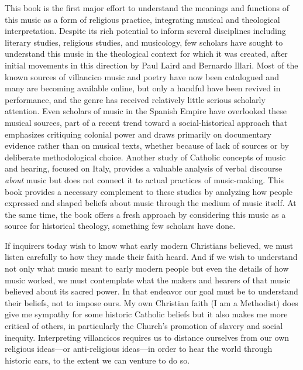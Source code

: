 This book is the first major effort to understand the meanings and functions of
this music as a form of religious practice, integrating musical and theological
interpretation.
Despite its rich potential to inform several disciplines including literary
studies, religious studies, and musicology, few scholars have sought to
understand this music in the theological context for which it was created,
after initial movements in this direction by Paul Laird and Bernardo Illari.%
    \Autocites
    {Laird:VC}
    {Illari:Polychoral}
Most of the known sources of villancico music and poetry have now been
catalogued and many are becoming available online, but only a handful have been
revived in performance, and the genre has received relatively little serious
scholarly attention.%
    \Autocite
    [][and other catalogs listed in the bibliography]
    {BNE:VCs17C}
Even scholars of music in the Spanish Empire have overlooked these musical
sources, part of a recent trend toward a social-historical approach that
emphasizes critiquing colonial power and draws primarily on documentary
evidence rather than on musical texts, whether because of lack of sources or
by deliberate methodological choice.%
    \Autocites
    {Tomlinson:SingingNewWorld}
    {Baker:Harmony}
    {Irving:Colonial}
    {RamosKittrell:PlayingCathedral}
Another study of Catholic concepts of music and hearing, focused on Italy,
provides a valuable analysis of verbal discourse \emph{about} music but does
not connect it to actual practices of music-making.%
    \Autocite{DellAntonio:Listening}
This book provides a necessary complement to these studies by analyzing how
people expressed and shaped beliefs about music through the medium of music
itself.
At the same time, the book offers a fresh approach by considering this music as
a source for historical theology, something few scholars have done.

If inquirers today wish to know what early modern Christians believed, we
must listen carefully to how they made their faith heard.
And if we wish to understand not only what music meant to early
modern people but even the details of how music worked, we must contemplate
what the makers and hearers of that music believed about its sacred power. 
In that endeavor our goal must be to understand their beliefs, not to impose
ours.
My own Christian faith (I am a Methodist) does give me sympathy for some
historic Catholic beliefs but it also makes me more critical of others, in
particularly the Church's promotion of slavery and social inequity.
Interpreting villancicos requires us to distance ourselves from our own
religious ideas---or anti-religious ideas---in order to hear the world through
historic ears, to the extent we can venture to do so.%
    \Autocite{Burstyn:PeriodEar}


